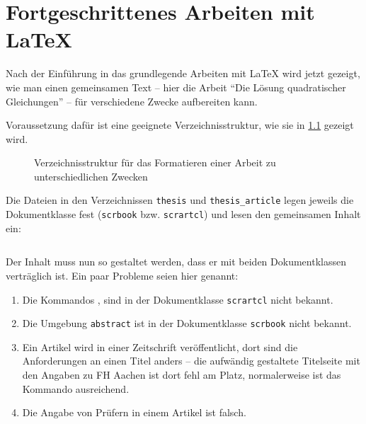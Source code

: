\documentclass[ngerman,               %
               a4paper,               %
               fleqn,                 %
                     ]{scrartcl}       %
\begin{document}
\chapter{Fortgeschrittenes Arbeiten mit \LaTeX}%
\label{chap:fortgeschrittenes-arbeiten}

Nach der Einführung in das grundlegende Arbeiten mit \LaTeX{} wird jetzt
gezeigt, wie man einen gemeinsamen Text -- hier die Arbeit "`Die Lösung
quadratischer Gleichungen"' -- für verschiedene Zwecke aufbereiten
kann.

Voraussetzung dafür ist eine geeignete Verzeichnisstruktur, wie sie
in \cref{fig:verzeichnisstruktur} gezeigt wird.
\begin{figure}[htb]
  \centering%
  
  \caption{Verzeichnisstruktur für das Formatieren einer Arbeit zu
  unterschiedlichen Zwecken}%
  \label{fig:verzeichnisstruktur}
\end{figure}

Die Dateien in den Verzeichnissen \texttt{thesis} und \texttt{thesis\_article}
legen jeweils die Dokumentklasse fest (\texttt{scrbook} bzw.
\texttt{scrartcl}) und lesen den gemeinsamen Inhalt ein:
\begin{lstlisting}

\end{lstlisting}

Der Inhalt muss nun so gestaltet werden, dass er mit beiden Dokumentklassen
verträglich ist. Ein paar Probleme seien hier genannt:
\begin{enumerate}
    \item Die Kommandos ,  sind in der Dokumentklasse
      \texttt{scrartcl} nicht bekannt.
    \item Die Umgebung \texttt{abstract} ist in der Dokumentklasse
      \texttt{scrbook} nicht bekannt.
    \item Ein Artikel wird in einer Zeitschrift veröffentlicht, dort sind
      die Anforderungen an einen Titel anders -- die aufwändig
      gestaltete Titelseite mit den Angaben zu FH Aachen ist dort
      fehl am Platz, normalerweise ist
      das Kommando  ausreichend.
    \item Die Angabe von Prüfern in einem Artikel ist falsch.
\end{enumerate}
\end{document}
